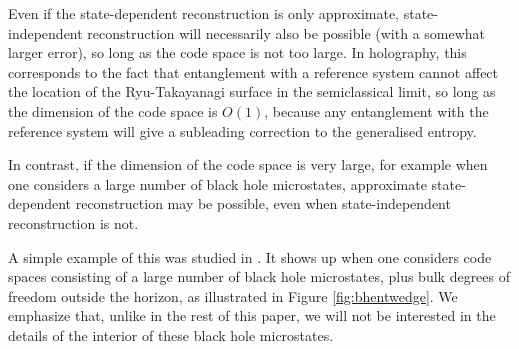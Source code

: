 \documentclass[11pt,a4paper]{article}
\begin{document}
Even if the state-dependent reconstruction is only approximate, state-independent reconstruction will necessarily also be possible (with a somewhat larger error), so long as the code space is not too large. In holography, this corresponds to the fact that entanglement with a reference system cannot affect the location of the Ryu-Takayanagi surface in the semiclassical limit, so long as the dimension of the code space is $O(1)$, because any entanglement with the reference system will give a subleading correction to the generalised entropy.

In contrast, if the dimension of the code space is very large, for example when one considers a large number of black hole microstates, approximate state-dependent reconstruction may be possible, even when state-independent reconstruction is not.

A simple example of this was studied in \cite{hayden2018learning}. It shows up when one considers code spaces consisting of a large number of black hole microstates, plus bulk degrees of freedom outside the horizon, as illustrated in Figure \ref{fig:bhentwedge}. We emphasize that, unlike in the rest of this paper, we will not be interested in the details of the interior of these black hole microstates.
\end{document}
